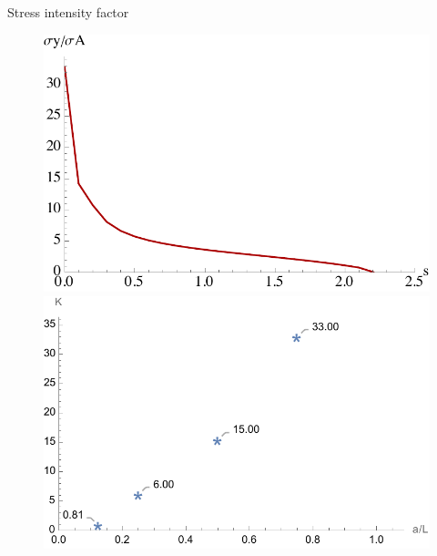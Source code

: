 \documentclass[aspectratio=169,xcolor=dvipsnames]{beamer}
\begin{document}
\begin{frame}{Stress intensity factor}
\begin{figure}
\begin{minipage}{0.35\linewidth}
\begin{minipage}[c]{0.5\linewidth}
		\includegraphics[width=\linewidth]{K_3L4.pdf}
	\end{minipage}\hfill
	\end{minipage}
	\begin{minipage}{0.6\linewidth}
		\centering
		\includegraphics[width=0.8\linewidth]{K.pdf}
\end{minipage}
\end{figure}
\end{frame}
\end{document}
